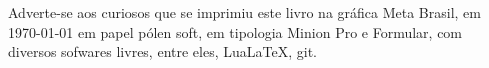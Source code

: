 \pagebreak

\ifodd\thepage\blankpage\fi

\mbox{}\vfill


\begin{center}
		\begin{minipage}{.7\textwidth}\tiny\noindent{}
		\centering\tiny
		Adverte-se aos curiosos que se imprimiu este 
		livro na gráfica Meta Brasil, 
		em \today{} em papel pólen soft, em tipologia Minion Pro e Formular, 
		com diversos sofwares livres, 
		entre eles, Lua\LaTeX, git.\\ 
		\medskip\\\
		\end{minipage}
\end{center}